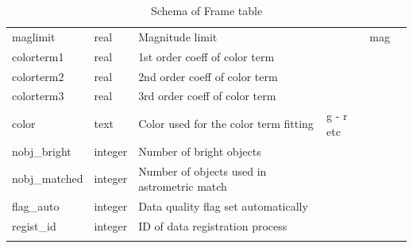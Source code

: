 \documentclass[12pt]{article}
\begin{document}
\begin{table}[thbp]
\begin{center}
{\begin{tabular}{llllll}
maglimit & real & Magnitude limit                                     &                            & mag         &   \\
colorterm1 & real & 1st order coeff of color term                       &                            &             &   \\
colorterm2 & real & 2nd order coeff of color term                       &                            &             &   \\
colorterm3 & real & 3rd order coeff of color term                       &                            &             &   \\
color & text & Color used for the color term fitting               & g - r  etc                 &             &   \\
nobj\_bright & integer & Number of bright objects                            &                            &             &   \\
nobj\_matched & integer & Number of objects used in astrometric match         &                            &             &   \\
flag\_auto & integer & Data quality flag set automatically                 &                            &             &   \\
regist\_id & integer & ID of data registration process                     &                            &             &   \\
\hline\\
\end{tabular}
}
\caption{Schema of Frame table}
\end{center}
\end{table}
\end{document}
